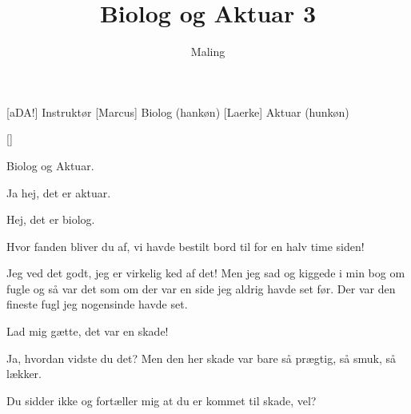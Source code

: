 \documentclass[a4paper,11pt]{article}
\title{Biolog og Aktuar 3}
\author{Maling}
\begin{document}
\maketitle

\begin{roles}
[aDA!] Instruktør
[Marcus] Biolog (hankøn)
[Laerke] Aktuar (hunkøn)
\end{roles}

\begin{props}
[]
\end{props}

\begin{sketch}
 Biolog og Aktuar.


 Ja hej, det er aktuar.

 Hej, det er biolog.

 Hvor fanden bliver du af, vi havde bestilt bord til for en halv time siden!

 Jeg ved det godt, jeg er virkelig ked af det! Men jeg sad og kiggede i min bog om fugle og så var det som om der var en side jeg aldrig havde set før. Der var den fineste fugl jeg nogensinde havde set.

 Lad mig gætte, det var en skade!

 Ja, hvordan vidste du det? Men den her skade var bare så prægtig, så smuk, så lækker.

 Du sidder ikke og fortæller mig at du er kommet til skade, vel?

\end{sketch}
\end{document}
